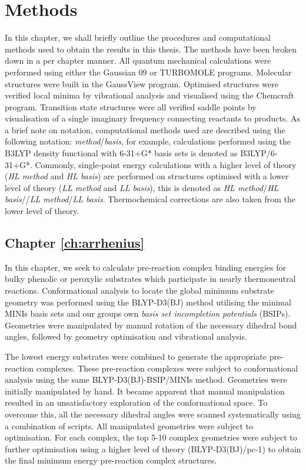 
\chapter{Methods}
\label{ch:methods}

In this chapter, we shall briefly outline the procedures and computational
methods used to obtain the results in this thesis. The methods have been broken
down in a per chapter manner. All quantum mechanical calculations were performed
using either the Gaussian 09\cite{Frisch2009} or TURBOMOLE
programs.\cite{turbomole} Molecular structures were built in the GaussView
program.\cite{gview} Optimised structures were verified local minima by
vibrational analysis and visualised using the Chemcraft program.\cite{ccraft}
Transition state structures were all verified saddle points by visualisation of
a single imaginary frequency connecting reactants to products. As a brief note
on notation, computational methods used are described using the following
notation: \emph{method}/\emph{basis}, for example, calculations performed using
the B3LYP density functional with 6-31+G* basis sets is denoted as
B3LYP/6-31+G*. Commonly, single-point energy calculations with a higher level of
theory (\emph{HL method} and \emph{HL basis}) are performed on structures
optimised with a lower level of theory (\emph{LL method} and \emph{LL basis}),
this is denoted as \emph{HL method}/\emph{HL basis}//\emph{LL method}/\emph{LL
  basis}. Thermochemical corrections are also taken from the lower level of
theory.

\section{Chapter \ref{ch:arrhenius}}

In this chapter, we seek to calculate pre-reaction complex binding energies for
bulky phenolic or peroxylic substrates which participate in nearly thermoneutral
reactions. Conformational analysis to locate the global minimum substrate
geometry was performed using the BLYP-D3(BJ)
method\cite{Becke1988,Lee1988,Grimme2010,Johnson2006} utilising the minimal
MINIs basis sets\cite{Huzinaga1984} and our groups own \emph{basis set
  incompletion potentials} (BSIPs). Geometries were
manipulated by manual rotation of the necessary dihedral bond angles, followed
by geometry optimisation and vibrational analysis.

The lowest energy substrates were combined to generate the appropriate
pre-reaction complexes. These pre-reaction complexes were subject to
conformational analysis using the same BLYP-D3(BJ)-BSIP/MINIs method. Geometries
were initially manipulated by hand. It became apparent that manual manipulation
resulted in an unsatisfactory exploration of the conformational space. To
overcome this, all the necessary dihedral angles were scanned systematically
using a combination of scripts.\cite{note5} All manipulated geometries were
subject to optimisation. For each complex, the top 5-10 complex geometries were
subject to further optimisation using a higher level of theory
(BLYP-D3(BJ)/pc-1) to obtain the final minimum energy pre-reaction complex
structures.

